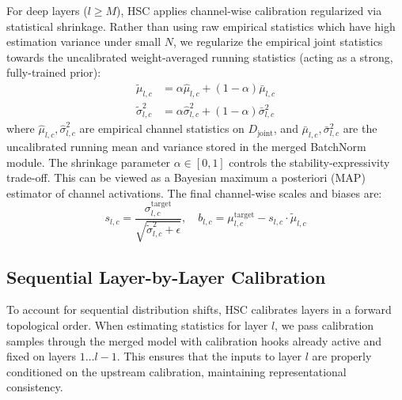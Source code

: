 \documentclass{article}
\begin{document}
For deep layers ($l \ge M$), HSC applies channel-wise calibration regularized via statistical shrinkage. Rather than using raw empirical statistics which have high estimation variance under small $N$, we regularize the empirical joint statistics towards the uncalibrated weight-averaged running statistics (acting as a strong, fully-trained prior):
\begin{align}
\tilde{\mu}_{l,c} &= \alpha \hat{\mu}_{l,c} + (1 - \alpha) \bar{\mu}_{l,c} \\
\tilde{\sigma}^2_{l,c} &= \alpha \hat{\sigma}^2_{l,c} + (1 - \alpha) \bar{\sigma}^2_{l,c}
\end{align}
where $\hat{\mu}_{l,c}, \hat{\sigma}^2_{l,c}$ are empirical channel statistics on $D_{\text{joint}}$, and $\bar{\mu}_{l,c}, \bar{\sigma}^2_{l,c}$ are the uncalibrated running mean and variance stored in the merged BatchNorm module. The shrinkage parameter $\alpha \in [0, 1]$ controls the stability-expressivity trade-off. This can be viewed as a Bayesian maximum a posteriori (MAP) estimator of channel activations. The final channel-wise scales and biases are:
\begin{equation}
s_{l,c} = \frac{\sigma^{\text{target}}_{l,c}}{\sqrt{\tilde{\sigma}^2_{l,c} + \epsilon}}, \quad b_{l,c} = \mu^{\text{target}}_{l,c} - s_{l,c} \cdot \tilde{\mu}_{l,c}
\end{equation}

\subsection{Sequential Layer-by-Layer Calibration}
To account for sequential distribution shifts, HSC calibrates layers in a forward topological order. When estimating statistics for layer $l$, we pass calibration samples through the merged model with calibration hooks already active and fixed on layers $1 \dots l-1$. This ensures that the inputs to layer $l$ are properly conditioned on the upstream calibration, maintaining representational consistency.
\end{document}
